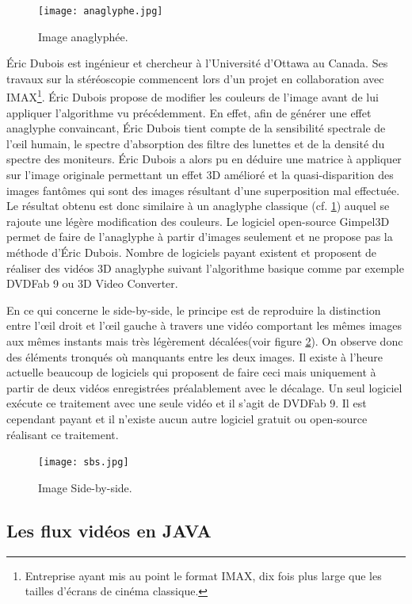 \documentclass[10pt,a4paper]{article}
\begin{document}
\begin{figure}[!h]
\center
\texttt{[image: anaglyphe.jpg]}
\caption{Image anaglyphée.}
\label{anaglyphe}
\end{figure}

Éric Dubois est ingénieur et chercheur à l'Université d'Ottawa au Canada\cite{duboisbio}. Ses travaux sur la stéréoscopie commencent lors d'un projet en collaboration avec IMAX\footnote{Entreprise ayant mis au point le format IMAX, dix fois plus large que les tailles d'écrans de cinéma classique.}. Éric Dubois propose de modifier les couleurs de l'image avant de lui appliquer l'algorithme vu précédemment.
En effet, afin de générer une effet anaglyphe convaincant, Éric Dubois tient compte de la sensibilité spectrale de l'œil humain,
le spectre d'absorption des filtre des lunettes et de la densité du spectre des moniteurs\cite{dubois}.
Éric Dubois a alors pu en déduire une matrice à appliquer sur l'image originale permettant un effet 3D amélioré et la quasi-disparition des images fantômes qui sont des images résultant d'une superposition mal effectuée. Le résultat obtenu est donc similaire à un anaglyphe classique (cf. \ref{anaglyphe}) auquel se rajoute une légère modification des couleurs.
Le logiciel open-source Gimpel3D permet de faire de l'anaglyphe à partir d'images seulement et ne propose pas la méthode d'Éric Dubois. Nombre de logiciels payant existent et proposent de réaliser des vidéos 3D anaglyphe suivant l'algorithme basique comme par exemple DVDFab 9 ou  3D Video Converter.\newline

En ce qui concerne le side-by-side, le principe est de reproduire la distinction entre l'œil droit et l'œil gauche à travers une vidéo comportant les mêmes images aux mêmes instants mais très légèrement décalées(voir figure \ref{sbs}). On observe donc des éléments tronqués où manquants entre les deux images.
Il existe à l'heure actuelle beaucoup de logiciels qui proposent de faire ceci mais uniquement à partir de deux vidéos enregistrées préalablement avec le décalage.
Un seul logiciel exécute ce traitement avec une seule vidéo et il s'agit de DVDFab 9. Il est cependant payant et il n'existe aucun autre logiciel gratuit ou open-source réalisant ce traitement.

\begin{figure}[!h]
\center
\texttt{[image: sbs.jpg]}
\caption{Image Side-by-side.}
\label{sbs}
\end{figure}

\subsection{Les flux vidéos en JAVA}
\end{document}
